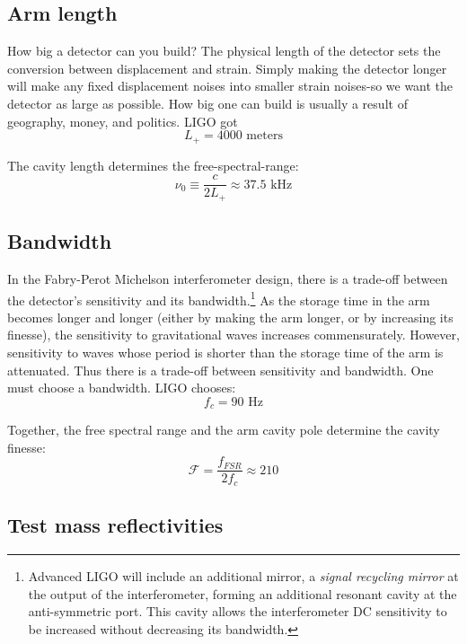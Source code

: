 \subsection*{Arm length}

How big a detector can you build? The physical length of the detector
sets the conversion between displacement and strain. Simply making the
detector longer will make any fixed displacement noises into smaller
strain noises-so we want the detector as large as possible. How big
one can build is usually a result of geography, money, and politics.
LIGO got
%
\begin{equation}
\boxed{{L_{+}=4000\text{{\ meters}}}}
\end{equation}

The cavity length determines the free-spectral-range:
%
\begin{equation}
\nu_0\equiv\frac{c}{2L_{+}}\approx37.5\text{ kHz}
\end{equation}

\subsection*{Bandwidth}

In the Fabry-Perot Michelson interferometer design, there is a trade-off
between the detector's sensitivity and its bandwidth.\footnote{Advanced LIGO will include an additional mirror, a \emph{signal recycling mirror} at the output of the interferometer, forming an additional resonant cavity at the anti-symmetric port.  This cavity allows the interferometer DC sensitivity to be increased without decreasing its bandwidth.}  As the storage
time in the arm becomes longer and longer (either by making the arm
longer, or by increasing its finesse), the sensitivity to gravitational
waves increases commensurately. However, sensitivity to waves whose
period is shorter than the storage time of the arm is attenuated.
Thus there is a trade-off between sensitivity and bandwidth. 
One must choose a bandwidth. LIGO chooses:
%
\begin{equation}
f_{c}=90\text{\ Hz}
\end{equation}

Together, the free spectral range and the arm cavity pole determine
the cavity finesse:
\begin{equation}
\mathcal{F}=\frac{f_{FSR}}{2f_{c}}\approx210
\end{equation}

\subsection*{Test mass reflectivities}

